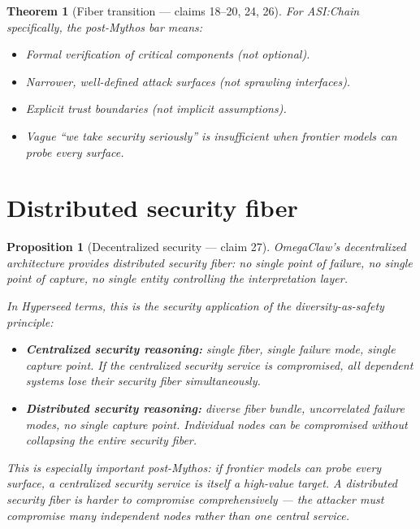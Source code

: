 \documentclass[11pt,a4paper]{article}
\newtheorem{theorem}[definition]{Theorem}
\newtheorem{proposition}[definition]{Proposition}
\begin{document}
\begin{theorem}[Fiber transition --- claims 18--20, 24, 26]
For ASI:Chain specifically, the post-Mythos bar means:
\begin{itemize}
\item Formal verification of critical components (not optional).
\item Narrower, well-defined attack surfaces (not sprawling interfaces).
\item Explicit trust boundaries (not implicit assumptions).
\item Vague ``we take security seriously'' is insufficient when
  frontier models can probe every surface.
\end{itemize}
\end{theorem}


\section{Distributed security fiber}
\label{sec:distributed}

\begin{proposition}[Decentralized security --- claim 27]
\label{prop:distributed}
OmegaClaw's decentralized architecture provides distributed security
fiber: no single point of failure, no single point of capture, no
single entity controlling the interpretation layer.

In Hyperseed terms, this is the security application of the
diversity-as-safety principle:
\begin{itemize}
\item \textbf{Centralized security reasoning:} single fiber, single
  failure mode, single capture point. If the centralized security
  service is compromised, all dependent systems lose their security
  fiber simultaneously.
\item \textbf{Distributed security reasoning:} diverse fiber bundle,
  uncorrelated failure modes, no single capture point. Individual
  nodes can be compromised without collapsing the entire security
  fiber.
\end{itemize}

This is especially important post-Mythos: if frontier models can
probe every surface, a centralized security service is itself a
high-value target. A distributed security fiber is harder to
compromise comprehensively --- the attacker must compromise many
independent nodes rather than one central service.
\end{proposition}
\end{document}

